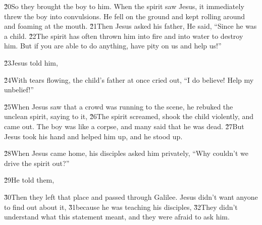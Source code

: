 \v{20}So they brought the boy to him. When the spirit saw Jesus, it immediately threw the boy into convulsions. He fell on the ground and kept rolling around and foaming at the mouth. \v{21}Then Jesus asked his father,  He said, ``Since he was a child. \v{22}The spirit has often thrown him into fire and into water to destroy him. But if you are able to do anything, have pity on us and help us!''

\v{23}Jesus told him, 

\v{24}With tears flowing, the child's father at once cried out, ``I do believe! Help my unbelief!''

\v{25}When Jesus saw that a crowd was running to the scene, he rebuked the unclean spirit, saying to it,  \v{26}The spirit screamed, shook the child violently, and came out. The boy was like a corpse, and many said that he was dead. \v{27}But Jesus took his hand and helped him up, and he stood up.

\v{28}When Jesus came home, his disciples asked him privately, ``Why couldn't we drive the spirit out?''

\v{29}He told them, 

\v{30}Then they left that place and passed through Galilee. Jesus didn't want anyone to find out about it, \v{31}because he was teaching his disciples,  \v{32}They didn't understand what this statement meant, and they were afraid to ask him.

